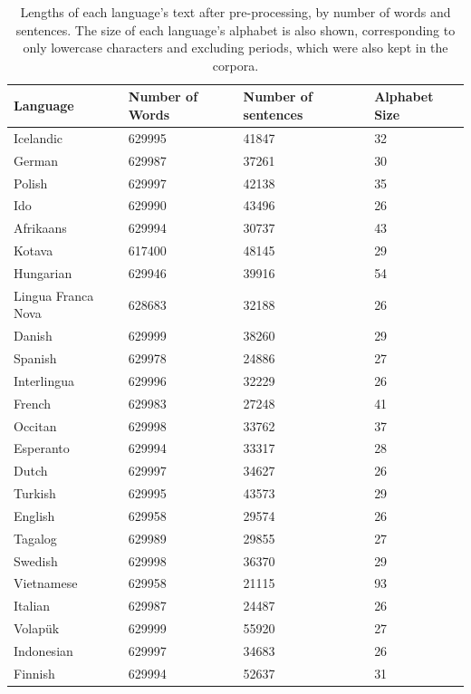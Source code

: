\documentclass[12pt,a4paper]{article}
\numberwithin{figure}{section}
\numberwithin{table}{section}
\numberwithin{definition}{section}
\begin{document}
\begin{table}[!h]
  \centering
  \renewcommand{\arraystretch}{1.5}
  \begin{tabular} {|p{3cm}|p{3cm}|p{3.5cm}|p{3.0cm}|}
  \hline
  \textbf{Language} & \textbf{Number of Words} & \textbf{Number of sentences} & \textbf{Alphabet Size} \\
  \hline
  Icelandic & 629995 & 41847 & 32 \\
  German & 629987 & 37261 & 30 \\
  Polish & 629997 & 42138 & 35 \\
  Ido & 629990 & 43496 & 26 \\
  Afrikaans & 629994 & 30737 & 43 \\
  Kotava & 617400 & 48145 & 29 \\
  Hungarian & 629946 & 39916 & 54 \\
  Lingua Franca Nova & 628683 & 32188 & 26 \\
  Danish & 629999 & 38260 & 29 \\
  Spanish & 629978 & 24886 & 27 \\
  Interlingua & 629996 & 32229 & 26 \\
  French & 629983 & 27248 & 41 \\
  Occitan & 629998 & 33762 & 37 \\
  Esperanto & 629994 & 33317 & 28 \\
  Dutch & 629997 & 34627 & 26 \\
  Turkish & 629995 & 43573 & 29 \\
  English & 629958 & 29574 & 26 \\
  Tagalog & 629989 & 29855 & 27 \\
  Swedish & 629998 & 36370 & 29 \\
  Vietnamese & 629958 & 21115 & 93 \\
  Italian & 629987 & 24487 & 26 \\
  Volapük & 629999 & 55920 & 27 \\
  Indonesian & 629997 & 34683 & 26 \\
  Finnish & 629994 & 52637 & 31 \\
  \hline
  \end{tabular}
\caption{Lengths of each language's text after pre-processing, by number of words and sentences. The size of each language's alphabet is also shown, corresponding to only lowercase characters and excluding periods, which were also kept in the corpora.}
\label{tbl:preprocessedtexts}
\end{table}
\end{document}
